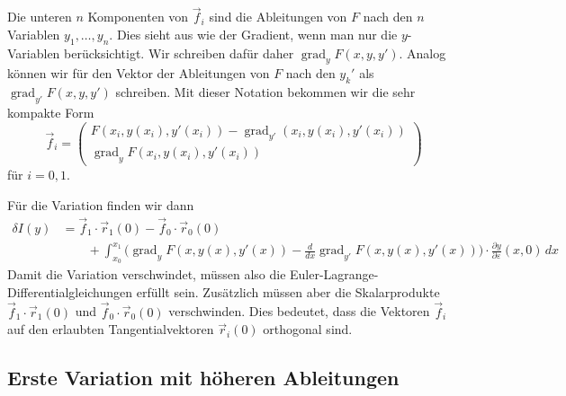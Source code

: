 Die unteren $n$ Komponenten von $\vec{f}_i$ sind die Ableitungen von
$F$ nach den $n$ Variablen $y_1,\dots,y_n$.
Dies sieht aus wie der Gradient, wenn man nur die $y$-Variablen 
berücksichtigt.
Wir schreiben dafür daher $\operatorname{grad}_yF(x,y,y')$.
Analog können wir für den Vektor der Ableitungen von $F$ nach den
$y_k'$ als $\operatorname{grad}_{y'}F(x,y,y')$ schreiben.
Mit dieser Notation bekommen wir die sehr kompakte Form
\[
\vec{f}_i
=
\begin{pmatrix}
F(x_i,y(x_i),y'(x_i)) - \operatorname{grad}_{y'}(x_i,y(x_i),y'(x_i))
\\
\operatorname{grad}_y F(x_i,y(x_i),y'(x_i))
\end{pmatrix}
\]
für $i=0,1$.

Für die Variation finden wir dann
\begin{align*}
\delta I(y)
&=
\vec{f}_1\cdot \vec{r}_1(0)
-
\vec{f}_0\cdot \vec{r}_0(0)
\\
&\qquad
+
\int_{x_0}^{x_1}
\biggl(
\operatorname{grad}_yF(x,y(x),y'(x))
-
\frac{d}{dx}
\operatorname{grad}_{y'}F(x,y(x),y'(x))
\biggr)
\cdot
\frac{\partial y}{\partial\varepsilon}(x,0)
\,dx
\end{align*}
Damit die Variation verschwindet, müssen also die
Euler-Lagrange-Differentialgleichungen erfüllt sein.
Zusätzlich müssen aber die Skalarprodukte
$\vec{f}_1\cdot \vec{r}_1(0)$
und
$\vec{f}_0\cdot \vec{r}_0(0)$
verschwinden.
Dies bedeutet, dass die Vektoren $\vec{f}_i$ auf den erlaubten
Tangentialvektoren $\vec{r}_i(0)$ orthogonal sind.


%
%
\subsection{Erste Variation mit höheren Ableitungen
\label{buch:variation:allgemein:subsection:var2h}}



